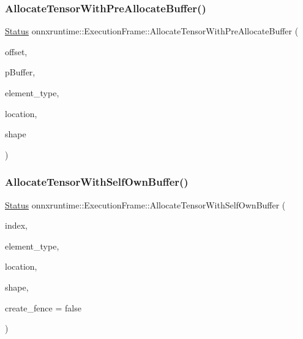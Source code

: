 \subsubsection{\texorpdfstring{Allocate\+Tensor\+With\+Pre\+Allocate\+Buffer()}{AllocateTensorWithPreAllocateBuffer()}}
{\footnotesize\ttfamily \mbox{\hyperlink{classonnxruntime_1_1common_1_1Status}{Status}} onnxruntime\+::\+Execution\+Frame\+::\+Allocate\+Tensor\+With\+Pre\+Allocate\+Buffer (\begin{DoxyParamCaption}\item[{int}]{offset,  }\item[{\mbox{\hyperlink{mlasi_8h_a88f941d423cb2a819b70a1358982b1a6}{void}} $\ast$}]{p\+Buffer,  }\item[{\mbox{\hyperlink{namespaceonnxruntime_ad77d0a6e838ec7da5dc35fed5ee66b49}{M\+L\+Data\+Type}}}]{element\+\_\+type,  }\item[{const \mbox{\hyperlink{structONNXRuntimeAllocatorInfo}{O\+N\+N\+X\+Runtime\+Allocator\+Info}} \&}]{location,  }\item[{const \mbox{\hyperlink{classonnxruntime_1_1TensorShape}{Tensor\+Shape}} \&}]{shape }\end{DoxyParamCaption})}

\mbox{\label{classonnxruntime_1_1ExecutionFrame_a6ae368c852cfcf373900369c11b0ce02}} 
\subsubsection{\texorpdfstring{Allocate\+Tensor\+With\+Self\+Own\+Buffer()}{AllocateTensorWithSelfOwnBuffer()}}
{\footnotesize\ttfamily \mbox{\hyperlink{classonnxruntime_1_1common_1_1Status}{Status}} onnxruntime\+::\+Execution\+Frame\+::\+Allocate\+Tensor\+With\+Self\+Own\+Buffer (\begin{DoxyParamCaption}\item[{int}]{index,  }\item[{\mbox{\hyperlink{namespaceonnxruntime_ad77d0a6e838ec7da5dc35fed5ee66b49}{M\+L\+Data\+Type}}}]{element\+\_\+type,  }\item[{const \mbox{\hyperlink{structONNXRuntimeAllocatorInfo}{O\+N\+N\+X\+Runtime\+Allocator\+Info}} \&}]{location,  }\item[{const \mbox{\hyperlink{classonnxruntime_1_1TensorShape}{Tensor\+Shape}} \&}]{shape,  }\item[{bool}]{create\+\_\+fence = {\ttfamily false} }\end{DoxyParamCaption})}

